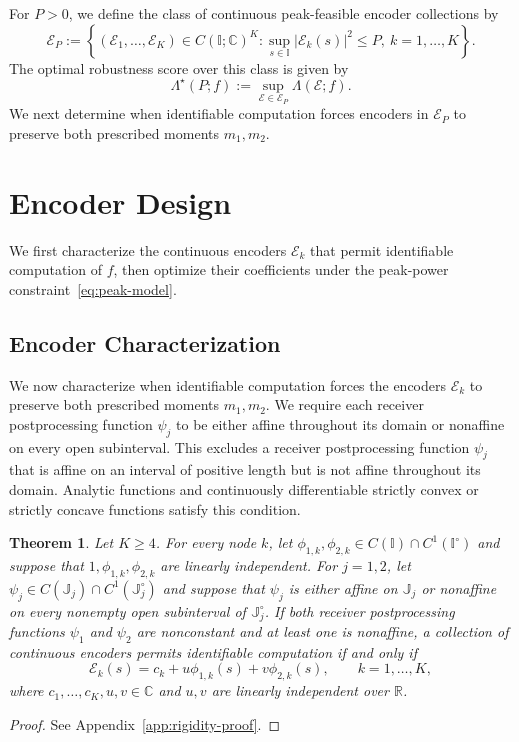 \documentclass[journal,12pt,onecolumn,draftclsnofoot]{IEEEtran}
\newtheorem{theorem}{Theorem}
\newcommand{\enc}{\mathscr{E}}\newcommand{\dec}{\mathscr{D}}\newcommand{\R}{\mathbb R}\newcommand{\C}{\mathbb C}
\begin{document}
For $P>0$, we define the class of continuous peak-feasible encoder
collections by
$$
\mathcal E_P:=\left\{
(\enc_1,\ldots,\enc_K)\in C(\mathbb I;\C)^K:
\sup_{s\in\mathbb I}|\enc_k(s)|^2\le P,
\ k=1,\ldots,K\right\}.
$$
The optimal robustness score over this class is given by
$$
\Lambda^\star(P;f):=
\sup_{\enc\in\mathcal E_P}\Lambda(\enc;f).
$$
We next determine when identifiable computation forces encoders
in $\mathcal E_P$ to preserve both prescribed moments $m_1,m_2$.





\section{Encoder Design}\label{sec:design}


We first characterize the continuous encoders $\enc_k$ that permit identifiable computation of $f$, then optimize their coefficients under the peak-power constraint~\eqref{eq:peak-model}.

\subsection{Encoder Characterization}\label{sec:rigidity}


We now characterize when identifiable computation forces the encoders $\enc_k$
to preserve both prescribed moments $m_1,m_2$. We require each receiver postprocessing function $\psi_j$
to be either affine throughout its domain or nonaffine on every open subinterval. This excludes a receiver postprocessing function $\psi_j$ that is affine on an interval of positive length but is not affine throughout its domain. Analytic functions and continuously differentiable strictly convex or strictly concave functions satisfy this condition.

\begin{theorem}
\label{thm:rigidity}\label{thm:general-rigidity}
Let $K\ge4$. For every node $k$, let
$\phi_{1,k},\phi_{2,k}\in C(\mathbb I)\cap C^1(\mathbb I^\circ)$ and suppose
that $1,\phi_{1,k},\phi_{2,k}$ are linearly independent. For $j=1,2$,
let $\psi_j\in C(\mathbb J_j)\cap C^1(\mathbb J_j^\circ)$ and
suppose that $\psi_j$ is either affine on $\mathbb J_j$ or
nonaffine on every nonempty open subinterval of
$\mathbb J_j^\circ$. If both receiver postprocessing functions $\psi_1$ and $\psi_2$ are nonconstant
and at least one is nonaffine, a collection of continuous encoders
permits identifiable computation if and only if
\begin{equation}
 \mathscr E_k(s)=c_k+u\phi_{1,k}(s)+v\phi_{2,k}(s),\qquad k=1,\ldots,K,
 \label{eq:affine}
\end{equation}
where $c_1,\ldots,c_K,u,v\in\C$ and $u,v$ are linearly independent over $\R$.
\end{theorem}
\begin{proof}
   See Appendix~\ref{app:rigidity-proof}.
\end{proof}
\end{document}
